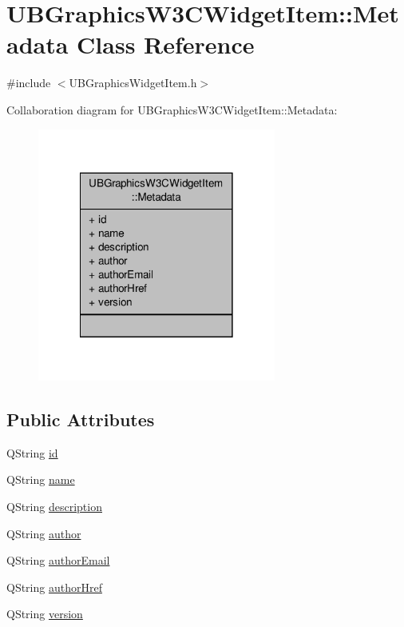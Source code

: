\hypertarget{class_u_b_graphics_w3_c_widget_item_1_1_metadata}{\section{U\-B\-Graphics\-W3\-C\-Widget\-Item\-:\-:Metadata Class Reference}
\label{d2/dea/class_u_b_graphics_w3_c_widget_item_1_1_metadata}
}


{\ttfamily \#include $<$U\-B\-Graphics\-Widget\-Item.\-h$>$}



Collaboration diagram for U\-B\-Graphics\-W3\-C\-Widget\-Item\-:\-:Metadata\-:
\nopagebreak
\begin{figure}[H]
\begin{center}
\leavevmode
\includegraphics[width=222pt]{d4/d9e/class_u_b_graphics_w3_c_widget_item_1_1_metadata__coll__graph}
\end{center}
\end{figure}
\subsection*{Public Attributes}
\begin{DoxyCompactItemize}
\item 
Q\-String \hyperlink{class_u_b_graphics_w3_c_widget_item_1_1_metadata_aa71a03b257d8af4470bc35ddd16282c8}{id}
\item 
Q\-String \hyperlink{class_u_b_graphics_w3_c_widget_item_1_1_metadata_a0f9a4896e60269923cfb5b7ae57fc7a1}{name}
\item 
Q\-String \hyperlink{class_u_b_graphics_w3_c_widget_item_1_1_metadata_abea90db5cdb67a44d7f97b531df2b498}{description}
\item 
Q\-String \hyperlink{class_u_b_graphics_w3_c_widget_item_1_1_metadata_a89bd4024f31e94fd1b5cbf1716b2957a}{author}
\item 
Q\-String \hyperlink{class_u_b_graphics_w3_c_widget_item_1_1_metadata_ab31aec6e2eaf96adaa4a18c946103418}{author\-Email}
\item 
Q\-String \hyperlink{class_u_b_graphics_w3_c_widget_item_1_1_metadata_a0af30b6e6c5004ecee71097573e1ec9a}{author\-Href}
\item 
Q\-String \hyperlink{class_u_b_graphics_w3_c_widget_item_1_1_metadata_a15316a02ed1ad1971ee802f5e5eb2296}{version}
\end{DoxyCompactItemize}


